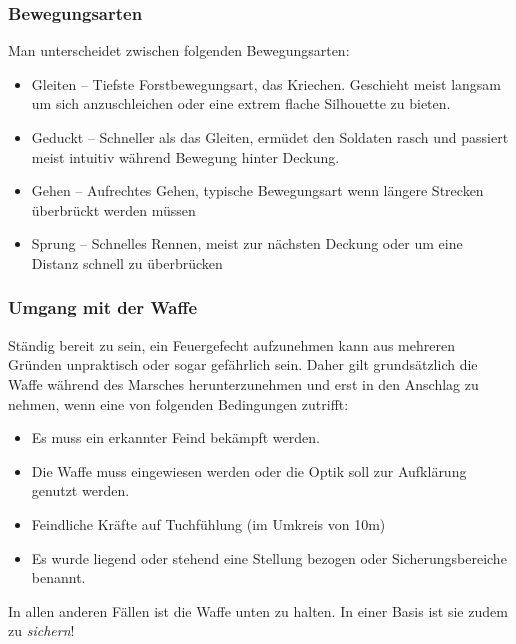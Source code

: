 \subsubsection{Bewegungsarten}
	Man unterscheidet zwischen folgenden Bewegungsarten:
	\begin{itemize}
		\item Gleiten -- Tiefste Forstbewegungsart, das Kriechen. Geschieht meist langsam um sich anzuschleichen oder eine extrem flache Silhouette zu bieten.
		\item Geduckt -- Schneller als das Gleiten, ermüdet den Soldaten rasch und passiert meist intuitiv während Bewegung hinter Deckung.
		\item Gehen -- Aufrechtes Gehen, typische Bewegungsart wenn längere Strecken überbrückt werden müssen
		\item Sprung -- Schnelles Rennen, meist zur nächsten Deckung oder um eine Distanz schnell zu überbrücken
	\end{itemize}

\subsubsection{Umgang mit der Waffe}
	Ständig bereit zu sein, ein Feuergefecht aufzunehmen kann aus mehreren Gründen unpraktisch oder sogar gefährlich sein. Daher gilt grundsätzlich die Waffe während des Marsches herunterzunehmen und erst in den Anschlag zu nehmen, wenn eine von folgenden Bedingungen zutrifft:
	\begin{itemize}
		\item Es muss ein erkannter Feind bekämpft werden.
		\item Die Waffe muss eingewiesen werden oder die Optik soll zur Aufklärung genutzt werden.
		\item Feindliche Kräfte auf Tuchfühlung (im Umkreis von 10m)
		\item Es wurde liegend oder stehend eine Stellung bezogen oder Sicherungsbereiche benannt.
	\end{itemize}

	In allen anderen Fällen ist die Waffe unten zu halten. In einer Basis ist sie zudem zu \textit{sichern}! \hfil\\
	
